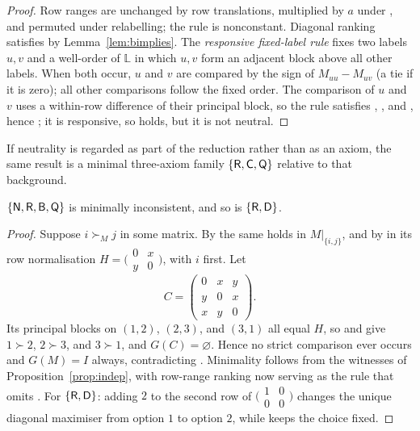 \begin{proof}
Row ranges are unchanged by row translations, multiplied by $a$ under , and permuted under
relabelling; the rule is nonconstant. Diagonal ranking satisfies  by Lemma~\ref{lem:bimplies}.
The \emph{responsive fixed-label rule} fixes two labels $u,v$ and a well-order of $\mathbb L$ in which
$u,v$ form an adjacent block above all other labels. When both occur, $u$ and $v$ are compared by the
sign of $M_{uu}-M_{uv}$ (a tie if it is zero); all other comparisons follow the fixed order. The
comparison of $u$ and $v$ uses a within-row difference of their principal block, so the rule satisfies
, , and , hence ; it is responsive, so  holds, but it is not neutral.
\end{proof}

If neutrality is regarded as part of the reduction  rather than as an axiom, the same result is
a minimal three-axiom family $\{\textup{\textsf{R}},\textup{\textsf{C}},\textup{\textsf{Q}}\}$ relative to that background.

\begin{proposition}\label{prop:NRBQ}
$\{\textup{\textsf{N}},\textup{\textsf{R}},\textup{\textsf{B}},\textup{\textsf{Q}}\}$ is minimally inconsistent, and so is $\{\textup{\textsf{R}},\textup{\textsf{D}}\}$.
\end{proposition}

\begin{proof}
Suppose $i\succ_Mj$ in some matrix. By  the same holds in $M|_{\{i,j\}}$, and by  in its
row normalisation $H=\bigl(\begin{smallmatrix}0&x\\y&0\end{smallmatrix}\bigr)$, with $i$ first. Let
\[
  C=\begin{pmatrix}0&x&y\\y&0&x\\x&y&0\end{pmatrix}.
\]
Its principal blocks on $(1,2)$, $(2,3)$, and $(3,1)$ all equal $H$, so  and  give
$1\succ2$, $2\succ3$, and $3\succ1$, and $G(C)=\varnothing$. Hence no strict comparison ever occurs and
$G(M)=I$ always, contradicting . Minimality follows from the witnesses of
Proposition~\ref{prop:indep}, with row-range ranking now serving as the rule that omits . For $\{\textup{\textsf{R}},\textup{\textsf{D}}\}$: adding $2$ to the
second row of $\bigl(\begin{smallmatrix}1&0\\0&0\end{smallmatrix}\bigr)$ changes the unique diagonal
maximiser from option $1$ to option $2$, while  keeps the choice fixed.
\end{proof}

